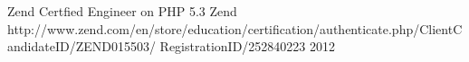 

\begin{cvhonors}

  \cvhonor
    {Zend Certfied Engineer on PHP 5.3} %
    {Zend} %
    {http://www.zend.com/en/store/education/certification/authenticate.php/ClientCandidateID/ZEND015503/
RegistrationID/252840223} %
    {2012} %

\end{cvhonors}
